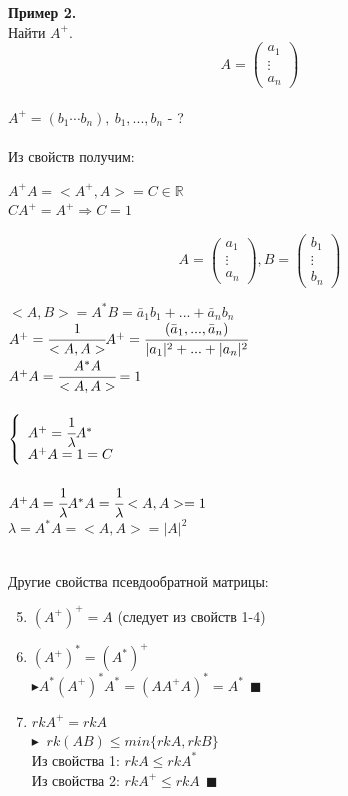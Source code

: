 \documentclass[12pt]{article}
\theoremstyle{definition}
\numberwithin{equation}{section}
\begin{document}
\textbf{Пример 2.}\\
Найти $A^+$.
\[A=\begin{pmatrix}
a_1 \\
\vdots \\         
a_n
\end{pmatrix}\]\\
$A^+=(b_1 \cdots b_n), ~ b_1,...,b_n$ - ?\\ \\
Из свойств получим:
\begin{center}
$A^+A=<A^+, A>=C \in \mathbb{R}$\\
$CA^+=A^+ \Rightarrow C=1$\\
\end{center}
\[A=\begin{pmatrix}
a_1 \\
\vdots \\         
a_n
\end{pmatrix}, B=\begin{pmatrix}
b_1 \\
\vdots \\         
b_n
\end{pmatrix}\] 
\begin{center}
$<A, B>=A^*B=\bar a_1 b_1+...+\bar a_n b_n$\\ 
$A^+=\cfrac{1}{<A, A>}A^+=\cfrac{(\bar a_1,..., \bar a_n)}{|a_1|^2+...+|a_n|^2}$\\ 
$A^+A=\cfrac{A^*A}{<A, A>}=1$\\~\\
$
\left\{  
\begin{array}{ll}  
    A^+=\cfrac{1}{\lambda}A^*\\
    A^+A=1=C
\end{array}   
\right.  
$
\\ ~\\
$A^+A=\cfrac{1}{\lambda}A^*A=\cfrac{1}{\lambda}<A, A>=1$\\
$\lambda =A^*A=<A, A>=|A|^2$\\
\end{center} 
~\\Другие свойства псевдообратной матрицы:
\begin{enumerate}
\setcounter{enumi}{4}
\item $(A^+)^+=A$ (следует из свойств 1-4)
\item $(A^+)^*=(A^*)^+$\\
$\blacktriangleright A^*(A^+)^*A^*=(AA^+A)^*=A^* ~~\blacksquare$
\item $rkA^+=rkA$\\
$\blacktriangleright$ $~rk(AB) \leqslant min\{rkA, rkB\}$\\
Из свойства 1: $rkA \leqslant rkA^*$\\
Из свойства 2: $rkA^+ \leqslant rkA ~~\blacksquare$
\end{enumerate}
\end{document}
